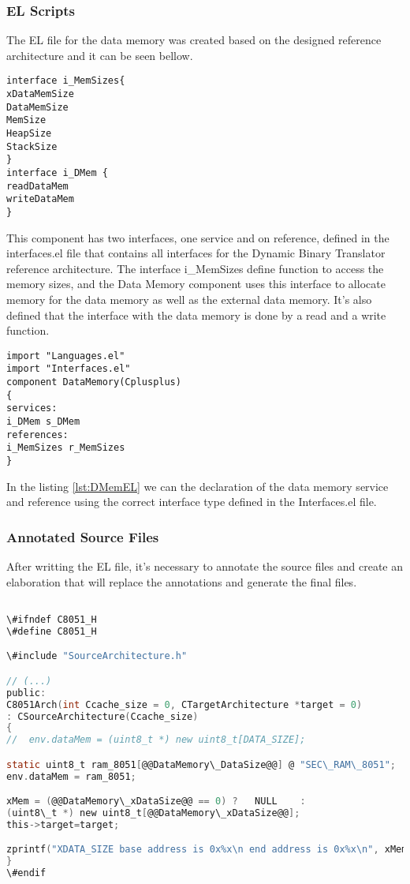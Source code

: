 \subsubsection{EL Scripts}
The EL file for the data memory was created based on the designed reference architecture and it can be seen bellow.
\begin{lstlisting}[caption={Data Memory Interfaces EL file}, label={lst:DMemInterfaces},language=EL]
interface i_MemSizes{
xDataMemSize
DataMemSize
MemSize
HeapSize	
StackSize
}
interface i_DMem {
readDataMem
writeDataMem
}
\end{lstlisting}

This component has two interfaces, one service and on reference, defined in the interfaces.el file that contains all interfaces for the Dynamic Binary Translator reference architecture. The interface i\_MemSizes define function to access the memory sizes, and the Data Memory component uses this interface to allocate memory for the data memory as well as the external data memory. It’s also defined that the interface with the data memory is done by a read and a write function.
\begin{lstlisting}[caption={Data Memory EL file}, label={lst:DMemEL},language=EL]
import "Languages.el"
import "Interfaces.el"
component DataMemory(Cplusplus)
{ 
services:
i_DMem s_DMem
references:
i_MemSizes r_MemSizes
}
\end{lstlisting}

In the listing \ref{lst:DMemEL} we can the declaration of the data memory service and reference using the correct interface type defined in the Interfaces.el file.


\subsubsection{Annotated Source Files}
After writting the EL file, it's necessary to annotate the source files and create an elaboration that will replace the annotations and generate the final files.

\begin{lstlisting}[caption=Annotated code - SourceArch\_8051.h, label=lst:annotSourceArch_8051,language=C]

\#ifndef C8051_H
\#define C8051_H

\#include "SourceArchitecture.h"

// (...)
public:
C8051Arch(int Ccache_size = 0, CTargetArchitecture *target = 0)
: CSourceArchitecture(Ccache_size)
{
//	env.dataMem = (uint8_t *) new uint8_t[DATA_SIZE];

static uint8_t ram_8051[@@DataMemory\_DataSize@@] @ "SEC\_RAM\_8051";
env.dataMem = ram_8051;

xMem = (@@DataMemory\_xDataSize@@ == 0) ?	NULL	:
(uint8\_t *) new uint8_t[@@DataMemory\_xDataSize@@];
this->target=target;

zprintf("XDATA_SIZE base address is 0x%x\n end address is 0x%x\n", xMem, xMem+@@DataMemory\_xDataSize@@ );
}
\#endif

\end{lstlisting}

